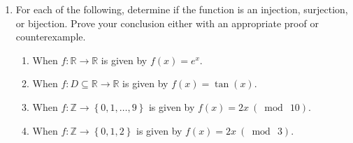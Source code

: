 \documentclass[12 pt]{article}
\newcommand{\R}{\mathbb{R}}
\newcommand{\Z}{\mathbb{Z}}
\newcommand{\set}[1]{\left\{#1\right\}}
\renewcommand{\subset}{\subseteq}
\newcommand{\mymod}[1]{ \ (\bmod \ #1)}
\theoremstyle{definition}
\theoremstyle{plain}
\theoremstyle{mytheorem}
\theoremstyle{myexample}
\theoremstyle{mydefinition}
\begin{document}
\begin{enumerate}
\item For each of the following, determine if the function is an injection, surjection, or bijection.  Prove your conclusion either with an appropriate proof or counterexample.
	\begin{enumerate}
	\item When $f: \R \to \R$ is given by $f(x)=e^x$.
	
	\vspace{3.5in}
	
	\item When $f: D \subset \R \to \R$ is given by $f(x)=\tan(x)$.
	
	\vspace{4in}
	
	\item When $f: \Z \to \set{0,1,\ldots,9}$ is given by $f(x) = 2x \mymod{10}$.
	
	\vspace{3.5in}
	
	\item When $f: \Z \to \set{0,1,2}$ is given by $f(x) = 2x \mymod{3}$.
	\end{enumerate}
\end{enumerate}
\end{document}
